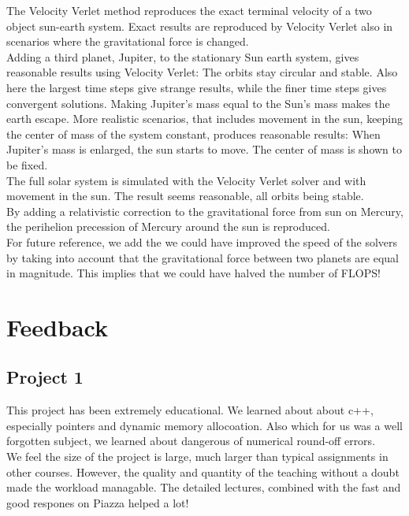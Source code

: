 \documentclass{article}
\begin{document}
The Velocity Verlet method reproduces the exact terminal velocity of a two object sun-earth system. Exact results are reproduced by Velocity Verlet also in scenarios where the gravitational force is changed. \\

Adding a third planet, Jupiter, to the stationary Sun earth system, gives reasonable results using Velocity Verlet: The orbits stay circular and stable. Also here the largest time steps give strange results, while the finer time steps gives convergent solutions. Making Jupiter's mass equal to the Sun's mass makes the earth escape. More realistic scenarios, that includes movement in the sun, keeping the center of mass of the system constant, produces reasonable results: When Jupiter's mass is enlarged, the sun starts to move. The center of mass is shown to be fixed.\\

The full solar system is simulated with the Velocity Verlet solver and with movement in the sun. The result seems reasonable, all orbits being stable.\\

By adding a relativistic correction to the gravitational force from sun on Mercury, the perihelion precession of Mercury around the sun is reproduced.\\

For future reference, we add the we could have improved the speed of the solvers by taking into account that the gravitational force between two planets are equal in magnitude. This implies that we could have halved the number of FLOPS!


\section{Feedback}
\subsection{Project 1}
This project has been extremely educational. We learned about about c++, especially pointers and dynamic memory allocoation. Also which for us was a well forgotten subject, we learned about dangerous of numerical round-off errors. \\

We feel the size of the project is large, much larger than typical assignments in other courses. However, the quality and quantity of the teaching without a doubt made the workload managable. The detailed lectures, combined with the fast and good respones on Piazza helped a lot!\\
\end{document}
